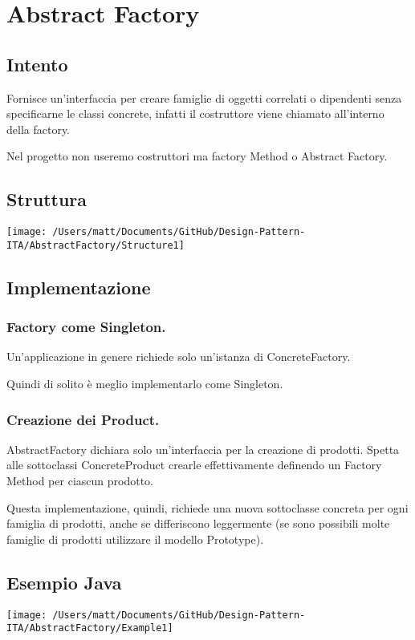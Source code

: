     \chapter{Abstract Factory}
    \section{Intento}
    
    Fornisce un'interfaccia per creare famiglie di oggetti correlati o dipendenti senza specificarne le classi concrete, infatti il costruttore viene chiamato all'interno della factory.

    Nel progetto non useremo costruttori ma factory Method o Abstract Factory.


    \section{Struttura}

    \texttt{[image: /Users/matt/Documents/GitHub/Design-Pattern-ITA/AbstractFactory/Structure1]}


    \section{Implementazione}

    \subsection{Factory come Singleton.}
        Un'applicazione in genere richiede solo un'istanza di ConcreteFactory.

        Quindi di solito è meglio implementarlo come Singleton.

    \subsection{Creazione dei Product.}         
        AbstractFactory dichiara solo un'interfaccia per la creazione di prodotti. Spetta alle sottoclassi ConcreteProduct crearle effettivamente definendo un Factory Method per ciascun prodotto.
        
        Questa implementazione, quindi, richiede una nuova sottoclasse concreta per ogni famiglia di prodotti, anche se differiscono leggermente (se sono possibili molte famiglie di prodotti utilizzare il modello Prototype).
    

    \section{Esempio Java}
    \texttt{[image: /Users/matt/Documents/GitHub/Design-Pattern-ITA/AbstractFactory/Example1]}

